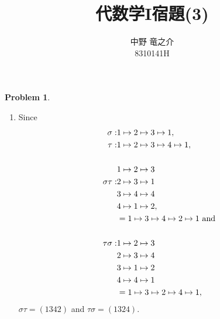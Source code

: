 \documentclass[a4paper, 12pt, fleqn, openany]{article}
\title{代数学I宿題(3)}
\author{中野 竜之介\\ 8310141H}
\theoremstyle{definition}
\newtheorem{prb}{Problem}
\begin{document}
\maketitle

\begin{prb}
    $ $
    \begin{enumerate}
        \item Since
        \begin{align*}
            \sigma  :& 1 \mapsto 2 \mapsto 3 \mapsto 1,\\
            \tau  :& 1 \mapsto 2 \mapsto 3 \mapsto 4 \mapsto 1,\\\\
                                        &1 \mapsto 2 \mapsto 3\\
            \sigma \tau :               &2 \mapsto 3 \mapsto 1\\
                                        &3 \mapsto 4 \mapsto 4\\
                                        &4 \mapsto 1 \mapsto 2,\\
                        &= 1 \mapsto 3 \mapsto 4 \mapsto 2 \mapsto 1 {\rm\ and}\\\\
            \tau \sigma :               &1 \mapsto 2 \mapsto 3\\
                                        &2 \mapsto 3 \mapsto 4\\
                                        &3 \mapsto 1 \mapsto 2\\
                                        &4 \mapsto 4 \mapsto 1\\
                        &= 1 \mapsto 3 \mapsto 2 \mapsto 4 \mapsto 1,
        \end{align*}
        $\sigma \tau = (1342)$ and $\tau \sigma = (1324)$.


\end{enumerate}
\end{prb}
\end{document}
